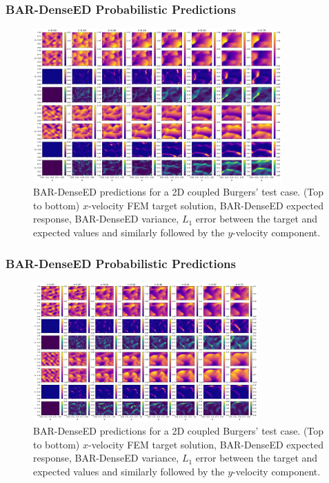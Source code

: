 \documentclass{beamer}
\theoremstyle{remark}
\begin{document}
\begin{frame}
\frametitle{BAR-DenseED Probabilistic Predictions}
\begin{figure}[H]
    \centering
    \includegraphics[width=0.85\textwidth]{Fig23.png}
    \caption{BAR-DenseED predictions for a 2D coupled Burgers' test case. (Top to bottom) $x$-velocity FEM target solution, BAR-DenseED expected response, BAR-DenseED variance, $L_1$ error between the target and expected values and similarly followed by the $y$-velocity component. }
    \label{fig:burgers2D-BARDenseED-1}
\end{figure}

\end{frame}

\begin{frame}
\frametitle{BAR-DenseED Probabilistic Predictions}
\begin{figure}[H]
    \centering
    \includegraphics[width=0.77\textwidth]{Fig24.png}
    \caption{BAR-DenseED predictions for a 2D coupled Burgers' test case. (Top to bottom) $x$-velocity FEM target solution, BAR-DenseED expected response, BAR-DenseED variance, $L_1$ error between the target and expected values and similarly followed by the $y$-velocity component.}
    \label{fig:burgers2D-BARDenseED-2}
\end{figure}
\end{frame}
\end{document}

